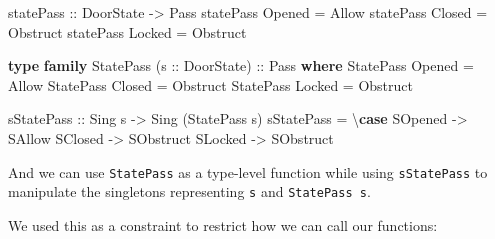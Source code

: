 \documentclass[]{article}
\newenvironment{Shaded}{}{}
\newcommand{\CommentTok}[1]{\textcolor[rgb]{0.38,0.63,0.69}{\textit{#1}}}
\newcommand{\DataTypeTok}[1]{\textcolor[rgb]{0.56,0.13,0.00}{#1}}
\newcommand{\FunctionTok}[1]{\textcolor[rgb]{0.02,0.16,0.49}{#1}}
\newcommand{\KeywordTok}[1]{\textcolor[rgb]{0.00,0.44,0.13}{\textbf{#1}}}
\newcommand{\NormalTok}[1]{#1}
\newcommand{\OperatorTok}[1]{\textcolor[rgb]{0.40,0.40,0.40}{#1}}
\newcommand{\OtherTok}[1]{\textcolor[rgb]{0.00,0.44,0.13}{#1}}
\newcommand{\StringTok}[1]{\textcolor[rgb]{0.25,0.44,0.63}{#1}}
\begin{document}
\begin{Shaded}
\begin{Highlighting}[]
\OtherTok{statePass ::} \DataTypeTok{DoorState} \OtherTok{{-}\textgreater{}} \DataTypeTok{Pass}
\NormalTok{statePass }\DataTypeTok{Opened} \OtherTok{=} \DataTypeTok{Allow}
\NormalTok{statePass }\DataTypeTok{Closed} \OtherTok{=} \DataTypeTok{Obstruct}
\NormalTok{statePass }\DataTypeTok{Locked} \OtherTok{=} \DataTypeTok{Obstruct}

\KeywordTok{type} \KeywordTok{family} \DataTypeTok{StatePass}\NormalTok{ (}\OtherTok{s ::} \DataTypeTok{DoorState}\NormalTok{)}\OtherTok{ ::} \DataTypeTok{Pass} \KeywordTok{where}
    \DataTypeTok{StatePass} \DataTypeTok{\textquotesingle{}Opened} \OtherTok{=} \DataTypeTok{\textquotesingle{}Allow}
    \DataTypeTok{StatePass} \DataTypeTok{\textquotesingle{}Closed} \OtherTok{=} \DataTypeTok{\textquotesingle{}Obstruct}
    \DataTypeTok{StatePass} \DataTypeTok{\textquotesingle{}Locked} \OtherTok{=} \DataTypeTok{\textquotesingle{}Obstruct}

\OtherTok{sStatePass ::} \DataTypeTok{Sing}\NormalTok{ s }\OtherTok{{-}\textgreater{}} \DataTypeTok{Sing}\NormalTok{ (}\DataTypeTok{StatePass}\NormalTok{ s)}
\NormalTok{sStatePass }\OtherTok{=}\NormalTok{ \textbackslash{}}\KeywordTok{case}
    \DataTypeTok{SOpened} \OtherTok{{-}\textgreater{}} \DataTypeTok{SAllow}
    \DataTypeTok{SClosed} \OtherTok{{-}\textgreater{}} \DataTypeTok{SObstruct}
    \DataTypeTok{SLocked} \OtherTok{{-}\textgreater{}} \DataTypeTok{SObstruct}
\end{Highlighting}
\end{Shaded}

And we can use \texttt{StatePass} as a type-level function while using
\texttt{sStatePass} to manipulate the singletons representing \texttt{s} and
\texttt{StatePass\ s}.

We used this as a constraint to restrict how we can call our functions:

\begin{Shaded}
\end{Shaded}
\end{document}
